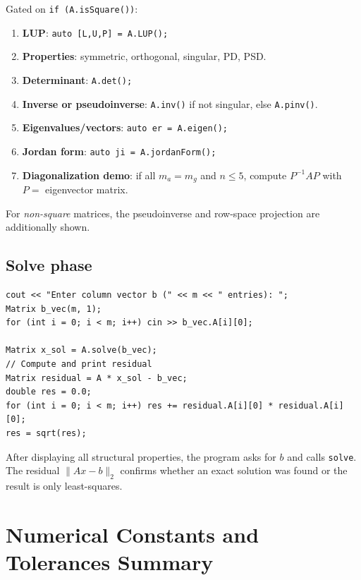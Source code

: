 \documentclass[12pt, a4paper]{article}
\newcommand{\code}[1]{\texttt{\small#1}}
\newcommand{\fn}[1]{\texttt{\small\color{funcgreen}#1}}
\begin{document}
Gated on \code{if (A.isSquare())}:
\begin{enumerate}[noitemsep]
  \item \textbf{LUP}: \code{auto [L,U,P] = A.LUP();}
  \item \textbf{Properties}: symmetric, orthogonal, singular, PD, PSD.
  \item \textbf{Determinant}: \code{A.det();}
  \item \textbf{Inverse or pseudoinverse}: \code{A.inv()} if not singular,
        else \code{A.pinv()}.
  \item \textbf{Eigenvalues/vectors}: \code{auto er = A.eigen();}
  \item \textbf{Jordan form}: \code{auto ji = A.jordanForm();}
  \item \textbf{Diagonalization demo}: if all $m_a = m_g$ and $n \leq 5$,
        compute $P^{-1}AP$ with $P =$ eigenvector matrix.
\end{enumerate}

For \emph{non-square} matrices, the pseudoinverse and row-space projection are
additionally shown.

\subsection{Solve phase}

\begin{lstlisting}
cout << "Enter column vector b (" << m << " entries): ";
Matrix b_vec(m, 1);
for (int i = 0; i < m; i++) cin >> b_vec.A[i][0];

Matrix x_sol = A.solve(b_vec);
// Compute and print residual
Matrix residual = A * x_sol - b_vec;
double res = 0.0;
for (int i = 0; i < m; i++) res += residual.A[i][0] * residual.A[i][0];
res = sqrt(res);
\end{lstlisting}

After displaying all structural properties, the program asks for $b$ and
calls \fn{solve}.  The residual $\|Ax - b\|_2$ confirms whether an exact
solution was found or the result is only least-squares.

\section{Numerical Constants and Tolerances Summary}
\end{document}
